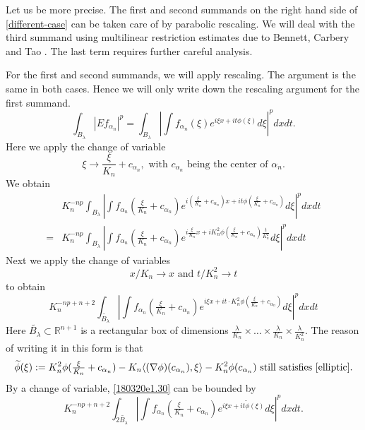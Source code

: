 \documentclass[12pt,leqno]{amsart}
\def\R{\mathbb{R}}
\def\beq{\begin{equation}}
\def\endeq{\end{equation}}
\theoremstyle{plain}
\numberwithin{equation}{section}
\begin{document}
Let us be more precise. The first and second summands on the right hand side of \eqref{different-case} can be taken care of by parabolic rescaling. We will deal with the third summand using multilinear restriction estimates due to Bennett, Carbery and Tao \cite{BCT06}. The last term requires further careful analysis.

For the first and second summands, we will apply rescaling. The argument is the same in both cases. Hence we will only write down the rescaling argument for the first summand. 
\[
\int_{B_{\lambda}} |Ef_{\alpha_n}|^p =\int_{B_{\lambda}} \left|\int f_{\alpha_n}(\xi)e^{i\xi x+it\phi(\xi)}d\xi \right|^p dxdt.
\]
Here we apply the change of variable 
\[
\xi\to \frac{\xi}{K_n} + c_{\alpha_n}, \text{ with } c_{\alpha_n} \text{ being the center of } \alpha_n. 
\]
We obtain 
\[
\begin{split}
& K_n^{-np}\int_{B_{\lambda}} \left|\int f_{\alpha_n}(\tfrac{\xi}{K_n}+c_{\alpha_n})e^{i(\tfrac{\xi}{K_n}+c_{\alpha_n}) x+i t \phi(\tfrac{\xi}{K_n}+c_{\alpha_n})}d\xi \right|^p dxdt\\
= & K_n^{-np}\int_{B_{\lambda}} \left|\int f_{\alpha_n}(\tfrac{\xi}{K_n}+c_{\alpha_n})e^{i\tfrac{\xi}{K_n} x+iK_n^2 \phi(\tfrac{\xi}{K_n}+c_{\alpha_n})\frac{t}{K_n^2}}d\xi\right|^p dxdt
\end{split}
\]
Next we apply the change of variables 
\[
x/K_n\to x \text{ and } t/K_n^2\to t
\]
to obtain 
\beq\label{180320e1.30}
K_n^{-np+n+2}\int_{\widetilde{B_{\lambda}}} \left|\int f_{\alpha_n}(\tfrac{\xi}{K_n}+c_{\alpha_n})e^{i\xi x+it\cdot K_n^2  \phi(\frac{\xi}{K_n}+c_{\alpha_n})}d\xi \right|^p dxdt
\endeq
Here $\widetilde{B_{\lambda}}\subset \R^{n+1}$ is a rectangular box of dimensions $\frac{\lambda}{K_n}\times \dots \times \frac{\lambda}{K_n}\times \frac{\lambda}{K_n^{2}}$. The reason of writing it in this form is that 
\[
\widetilde{\phi}(\xi):=K_n^2 \phi(\tfrac{\xi}{K_n}+c_{\alpha_n})-K_n \langle (\nabla \phi)(c_{\alpha_n}), \xi\rangle-K_n^2 \phi(c_{\alpha_n}) \text{ still satisfies } \eqref{elliptic}. 
\]
By a change of variable, \eqref{180320e1.30} can be bounded by 
\[
K_n^{-np+n+2}\int_{2\widetilde{B_{\lambda}}} \left|\int f_{\alpha_n}(\tfrac{\xi}{K_n}+c_{\alpha_n})e^{i\xi x+it \widetilde{\phi}(\xi)}d\xi \right|^p dxdt.
\]
\end{document}
